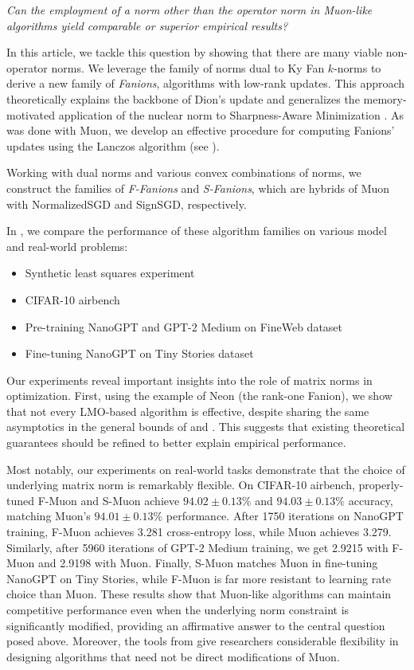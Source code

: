 \documentclass[pmlr]{jmlr}%
\begin{document}
 \emph{Can the employment of a norm other than the operator norm in Muon-like algorithms yield comparable or superior empirical results?}
 
 In this article, we tackle this question by showing that there are many viable non-operator norms. We leverage the family of norms dual to Ky Fan $k$-norms to derive a new family of \emph{Fanions}, algorithms with low-rank updates. This approach theoretically explains the backbone of Dion's update \citep{ahn2025dion} and generalizes the memory-motivated application of the nuclear norm to Sharpness-Aware Minimization \citep{pethick2025sam}. As was done with Muon, we develop an effective procedure for computing Fanions' updates using the Lanczos algorithm (see ).
 
 Working with dual norms and various convex combinations of norms, we construct the families of \emph{F-Fanions} and \emph{S-Fanions}, which are hybrids of Muon with NormalizedSGD and SignSGD, respectively.
 
 In , we compare the performance of these algorithm families on various model and real-world problems:
 \begin{itemize}
   \item Synthetic least squares experiment
   \item CIFAR-10 airbench \citep{cifar2023airbench}
   \item Pre-training NanoGPT and GPT-2 Medium on FineWeb dataset \citep{modded_nanogpt_2024}
   \item Fine-tuning NanoGPT on Tiny Stories dataset \citep{eldan2023tinystoriessmalllanguagemodels}
 \end{itemize}
 
 Our experiments reveal important insights into the role of matrix norms in optimization. First, using the example of Neon (the rank-one Fanion), we show that not every LMO-based algorithm is effective, despite sharing the same asymptotics in the general bounds of \citep{kovalev2025understanding} and \citep{riabinin2025gluon}. This suggests that existing theoretical guarantees should be refined to better explain empirical performance.
 
 Most notably, our experiments on real-world tasks demonstrate that the choice of underlying matrix norm is remarkably flexible. On CIFAR-10 airbench, properly-tuned F-Muon and S-Muon achieve $94.02 \pm 0.13\%$ and $94.03 \pm 0.13\%$ accuracy, matching Muon's $94.01 \pm 0.13\%$ performance. After 1750 iterations on NanoGPT training, F-Muon achieves 3.281 cross-entropy loss, while Muon achieves 3.279. Similarly, after 5960 iterations of GPT-2 Medium training, we get 2.9215 with F-Muon and 2.9198 with Muon. Finally, S-Muon matches Muon in fine-tuning NanoGPT on Tiny Stories, while F-Muon is far more resistant to learning rate choice than Muon. These results show that Muon-like algorithms can maintain competitive performance even when the underlying norm constraint is significantly modified, providing an affirmative answer to the central question posed above. Moreover, the tools from  give researchers considerable flexibility in designing algorithms that need not be direct modifications of Muon.
 
\end{document}
